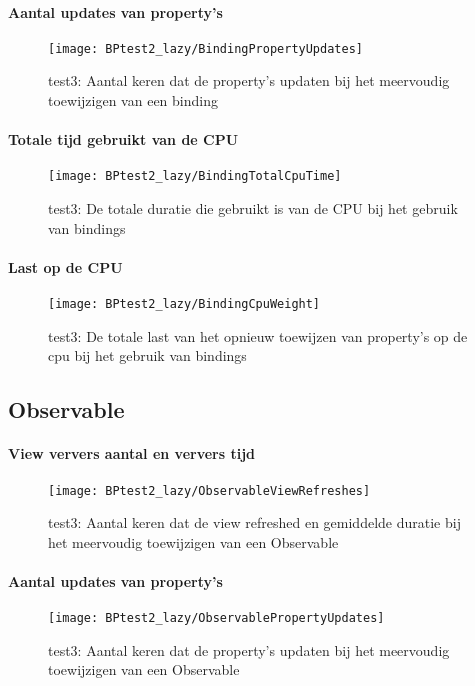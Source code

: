 \paragraph{Aantal updates van property's}
\begin{figure}[H]
    \centering
    \texttt{[image: BPtest2\_lazy/BindingPropertyUpdates]} 
    \caption{test3: Aantal keren dat de property's updaten bij het meervoudig toewijzigen van een binding}
    \label{fig:propertyUpdatesBinding2}
\end{figure}
\paragraph{Totale tijd gebruikt van de CPU}
\begin{figure}[H]
    \centering
    \texttt{[image: BPtest2\_lazy/BindingTotalCpuTime]} 
    \caption{test3: De totale duratie die gebruikt is van de CPU bij het gebruik van bindings}
    \label{fig:cpuUsageTimeBinding2}
\end{figure}
\paragraph{Last op de CPU}
\begin{figure}[H]
    \centering
    \texttt{[image: BPtest2\_lazy/BindingCpuWeight]} 
    \caption{test3: De totale last van het opnieuw toewijzen van property's op de cpu bij het gebruik van bindings}
    \label{fig:cpuWeightBinding2}
\end{figure}

\subsection{Observable}
\paragraph{View ververs aantal en ververs tijd}
\begin{figure}[H]
    \centering
    \texttt{[image: BPtest2\_lazy/ObservableViewRefreshes]} 
    \caption{test3: Aantal keren dat de view refreshed en gemiddelde duratie bij het meervoudig toewijzigen van een Observable}
    \label{fig:viewRefreshesObservable2}
\end{figure}
\paragraph{Aantal updates van property's}
\begin{figure}[H]
    \centering
    \texttt{[image: BPtest2\_lazy/ObservablePropertyUpdates]} 
    \caption{test3: Aantal keren dat de property's updaten bij het meervoudig toewijzigen van een Observable}
    \label{fig:propertyUpdatesObservable2}
\end{figure}
